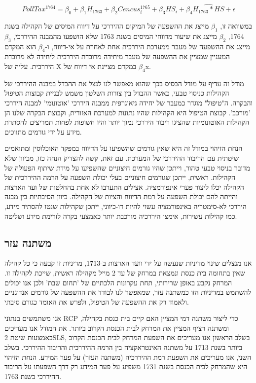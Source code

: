 $$ PollTax^{1764} = \beta_0 + \beta_1 {H}_{1763} + \beta_2 Cencus^{1765}_i + \beta_3 HS_i + \beta_4 \widehat{H_{1763} * HS} + \epsilon $$



במשוואה זו, $\beta_1$ מייצג את ההשפעה של המיקום ההיררכי על דיווח המיסים של הקהילה בשנת 1764, $\beta_2$ מייצג את שיעור מדווחי המיסים בשנת 1763 שלא הושפעו מהמבנה ההיררכי, $\beta_3$ מייצג את ההשפעה של מעבר ממערכת היררכית אחת לאחרת על אי-דיווח, ו-$\beta_4$ הוא המקדם המעניין שמציין את ההשפעה של מעבר מיחידה מרובדת היררכית ליחידה לא מרובדת היררכית. עליה של X במקדם מציינת אי דיווח של $\beta_4$x.

מודל זה עדיף על מודל הבסיס בכך שהוא מאפשר לנו לנצל את ההבדל במבנה ההיררכי של הקהילות כניסוי טבעי, כאשר ההבדל בין צורות השלטון משמש לבניית קבוצות הטיפול והבקרה. ה"טיפול" מוגדר כמעבר של יחידה גיאוגרפית ממבנה היררכי 'אוטונומי' למבנה היררכי 'מורכב'. קבוצת הטיפול היא הקהילות שהיו נתונות למערכת האזורית, וקבוצת הבקרה שלנו הן הקהילות האוטונומיות שהציגו ריבוד היררכי נמוך יותר והיו חשופות לפחות תמריצים להסתרת מידע על ידי גורמים מתווכים.

הנחת הזיהוי במודל זה היא שאין גורמים שהשפיעו על הדיווח במפקד האוכלוסין ומתואמים שיטתית עם הריבוד ההיררכי של המערכת. עם זאת, קשה להצדיק הנחה כזו, מכיוון שלא מדובר בניסוי טבעי טהור, וייתכן שהיו גורמים חיצוניים שהשפיעו על מידת שיתוף הפעולה של הקהילות. ראשית, ייתכן שגורמים חיצוניים בעלי יכולת השפעה על הרמה ההיררכית של הקהילה יכלו ליצור פערי אינפורמציה. אצילים התערבו לא אחת בהחלטות של ועד הארצות והייתה להם יכולת השפעה על רמת הדיווח והציות של הקהילה. כיוון הסיבתיות בין מבנה היררכי לא-סימטריה באינפורמציה עשוי להיות דו-כיווני, ייתכן שקהילות שנטו להסתיר מידע, כמו קהילות עשירות, אימצו היררכיה מורכבת יותר כאמצעי בקרה לזרימת מידע ושליטה.


\subsection{משתנה עזר}

אנו מנצלים שינוי מדיניות שנעשה על ידי וועד הארצות ב-1713, מדיניות זו קבעה כי כל קהילה שאין בתחומה בית כנסת ונמצאת במרחק של עד 2 מייל מקהילה ראשית, שייכת לקהילה זו. המרחק נקבע באופן שרירותי, תחת עקרונות הלכתיים של 'תחום שבת' ולכן אנו יכולים להשתמש במדיניות הזו כמשתנה עזר, שמאפשר לנו לבודד את ההשפעה של גורמים אנדוגניים ולאמוד רק את ההשפעה של הטיפול, ולפרש את האומד כגורם סיבתי.  

אנו משתמשים בנתוני RCP כדי ליצור משתנה דמי המציין האם קיים בית כנסת בקהילה, ומשתנה רציף המציין את המרחק לבית הכנסת הקרוב ביותר. את המודל אנו מעריכים באמצעות שיטת 2SLS, בשלב הראשון אנו מעריכים את השפעת המרחק לבית הכנסת הקרוב ביותר בשנת 1713 על משתנה האינטראקציה בין הרמה ההיררכית והריבוד ההיררכי. בשלב השני, אנו מעריכים את השפעת רמת ההיררכיה (משתנה העזר) על פער המידע. הנחת הזיהוי היא שהמרחק לבית הכנסת בשנת 1731 משפיע על פער המידע רק דרך השפעתו על הריבוד ההיררכי בשנת 1763.
	
